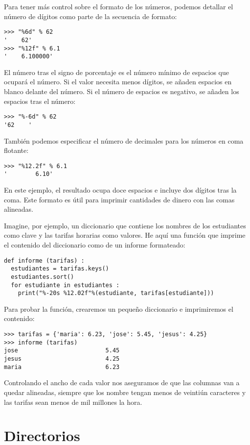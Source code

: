 Para tener más control sobre el formato de los números, podemos detallar
el número de dígitos como parte de la secuencia de formato:
\begin{lstlisting}
>>> "%6d" % 62
'    62'
>>> "%12f" % 6.1
'    6.100000'
\end{lstlisting}
El número tras el signo de porcentaje es el número mínimo de espacios
que ocupará el número. Si el valor necesita menos dígitos, se añaden
espacios en blanco delante del número. Si el número de espacios es
negativo, se añaden los espacios tras el número:
\begin{lstlisting}
>>> "%-6d" % 62
'62    '
\end{lstlisting}
También podemos especificar el número de decimales para los números
en coma flotante:
\begin{lstlisting}
>>> "%12.2f" % 6.1
'        6.10'
\end{lstlisting}
En este ejemplo, el resultado ocupa doce espacios e incluye dos dígitos
tras la coma. Este formato es útil para imprimir cantidades de dinero
con las comas alineadas.


Imagine, por ejemplo, un diccionario que contiene los nombres de los
estudiantes como clave y las tarifas horarias como valores. He aquí
una función que imprime el contenido del diccionario como de un informe
formateado:
\begin{lstlisting}
def informe (tarifas) :
  estudiantes = tarifas.keys()
  estudiantes.sort()
  for estudiante in estudiantes :
    print("%-20s %12.02f"%(estudiante, tarifas[estudiante]))
\end{lstlisting}
Para probar la función, crearemos un pequeño diccionario e imprimiremos
el contenido:
\begin{lstlisting}
>>> tarifas = {'maria': 6.23, 'jose': 5.45, 'jesus': 4.25}
>>> informe (tarifas)
jose                         5.45
jesus                        4.25
maria                        6.23
\end{lstlisting}
Controlando el ancho de cada valor nos aseguramos de que las columnas
van a quedar alineadas, siempre que los nombre tengan menos de veintiún
caracteres y las tarifas sean menos de mil millones la hora.

\section{Directorios}

